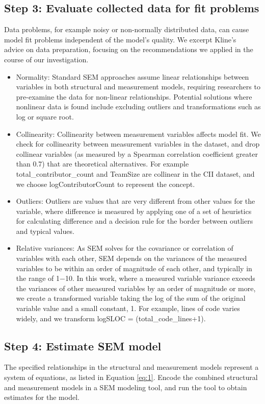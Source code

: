 \subsection{Step 3: Evaluate collected data for fit problems}
Data problems, for example noisy or non-normally distributed data, can cause model fit problems independent of the model's quality. We excerpt Kline's~\cite{kline2015principles} advice on data preparation, focusing on the recommendations we applied in the course of our investigation. 
\begin{itemize}
\item{Normality}:
Standard SEM approaches assume linear relationships between variables in both structural and measurement models, requiring researchers to pre-examine the data for non-linear relationships. Potential solutions where nonlinear data is found include excluding outliers and transformations such as log or square root.
\item{Collinearity}:
Collinearity between measurement variables affects model fit. We check for collinearity between measurement variables in the dataset, and drop collinear variables (as measured by a Spearman correlation coefficient greater than 0.7) that are theoretical alternatives. For example total\_contributor\_count and TeamSize are collinear in the CII dataset, and we choose logContributorCount to represent the concept.
\item{Outliers}:
Outliers are values that are very different from other values for the variable, where difference is measured by applying one of a set of heuristics for calculating difference and a decision rule for the border between outliers and typical values. 
\item{Relative variances}:
As SEM solves for the covariance or correlation of variables with each other, SEM depends on the variances of the measured variables to be within an order of magnitude of each other, and typically in the range of 1$-$10. In this work, where a measured variable variance exceeds the variances of other measured variables by an order of magnitude or more, we create a transformed variable taking the log of the sum of the original variable value and a small constant, 1. For example, lines of code varies widely, and  we transform logSLOC = (total\_code\_lines+1).
\end{itemize}

\subsection{Step 4: Estimate SEM model} 
The specified relationships in the structural and measurement models represent a system of equations, as listed in Equation \ref{eq:1}. Encode the combined structural and measurement models in a SEM modeling tool, and run the tool to obtain estimates for the model. 

